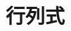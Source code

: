 \documentclass[../../topic_linear-algebra]{subfiles}
\begin{document}
\chapter{行列式}



\end{document}
